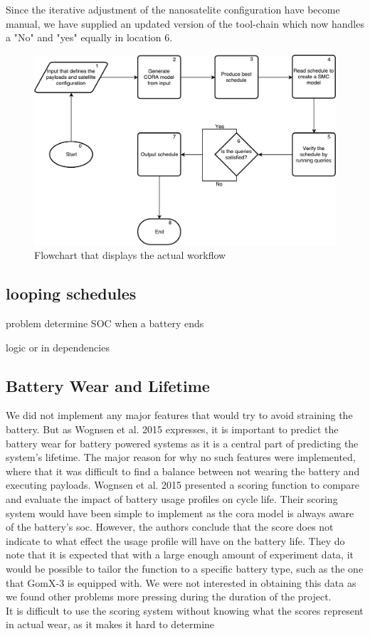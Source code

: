 Since the iterative adjustment of the nanosatelite configuration have become manual, we have supplied an updated version of the tool-chain which now handles a "No" and "yes" equally in location 6.
\begin{figure}[h]
	\includegraphics[width=\textwidth]{graphics/flow_act.pdf}
	\caption{Flowchart that displays the actual workflow}
	\label{fig:tool_act}
\end{figure}


\subsection*{looping schedules}
problem determine SOC when a battery ends 

logic or in dependencies

\subsection{Battery Wear and Lifetime} \label{subsec:disc_life}
We did not implement any major features that would try to avoid straining the battery. 
But as Wognsen et al. 2015\cite{score_function} expresses, it is important to predict the battery wear for battery powered systems as it is a central part of predicting the system's lifetime.
The major reason for why no such features were implemented, where that it was difficult to find a balance between not wearing the battery and executing payloads.
Wognsen et al. 2015\cite{score_function} presented a scoring function to compare and evaluate the impact of battery usage profiles on cycle life. Their scoring system would have been simple to implement as the \gls{cora} model is always aware of the battery's \gls{soc}. However, the authors conclude that the score does not indicate to what effect the usage profile will have on the battery life. They do note that it is expected that with a large enough amount of experiment data, it would be possible to tailor the function to a specific battery type, such as the one that GomX-3 is equipped with. We were not interested in obtaining this data as we found other problems more pressing during the duration of the project.\\
It is difficult to use the scoring system without knowing what the scores represent in actual wear, as it makes it hard to determine 


